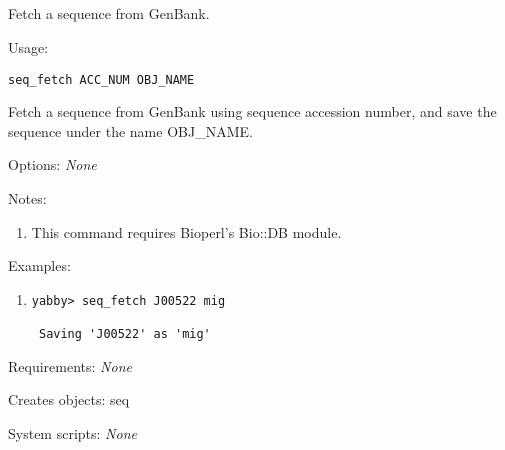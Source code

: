 

\subsection[seq\_fetch]{  }



Fetch a sequence from GenBank.


\begin{description}


\item{Usage:}

{\tt seq\_fetch ACC\_NUM OBJ\_NAME}

 Fetch a sequence from GenBank using sequence accession number,
 and save the sequence under the name OBJ\_NAME.


\item{Options:} {\em None}


\item{Notes:}
\begin{enumerate}
\item This command requires Bioperl's Bio::DB module.
\end{enumerate}


\item{Examples:}
\begin{enumerate}

\item
\begin{verbatim}
yabby> seq_fetch J00522 mig

 Saving 'J00522' as 'mig'

\end{verbatim}

\end{enumerate}


\item{Requirements:} {\em None}


\item{Creates objects:} seq


\item{System scripts:} {\em None}

\end{description}

